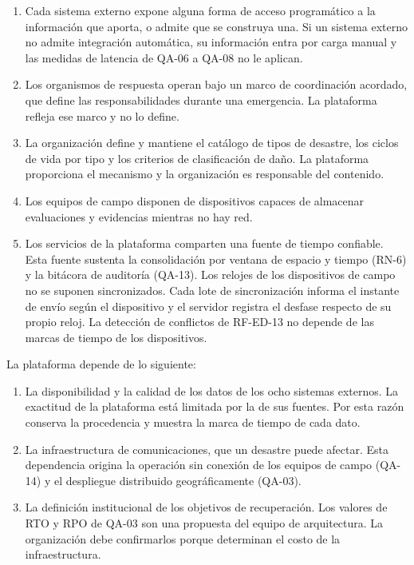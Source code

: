 \documentclass[11pt,letterpaper]{article}
\begin{document}
\begin{enumerate}[label=S-\arabic*.,leftmargin=1.4cm]
  \item Cada sistema externo expone alguna forma de acceso programático a la información que
        aporta, o admite que se construya una. Si un sistema externo no admite integración
        automática, su información entra por carga manual y las medidas de latencia de QA-06 a
        QA-08 no le aplican.
  \item Los organismos de respuesta operan bajo un marco de coordinación acordado, que define las
        responsabilidades durante una emergencia. La plataforma refleja ese marco y no lo define.
  \item La organización define y mantiene el catálogo de tipos de desastre, los ciclos de vida por
        tipo y los criterios de clasificación de daño. La plataforma proporciona el mecanismo y la
        organización es responsable del contenido.
  \item Los equipos de campo disponen de dispositivos capaces de almacenar evaluaciones y evidencias
        mientras no hay red.
  \item Los servicios de la plataforma comparten una fuente de tiempo confiable. Esta fuente
        sustenta la consolidación por ventana de espacio y tiempo (RN-6) y la bitácora de
        auditoría (QA-13). Los relojes de los dispositivos de campo no se suponen sincronizados.
        Cada lote de sincronización informa el instante de envío según el dispositivo y el servidor
        registra el desfase respecto de su propio reloj. La detección de conflictos de RF-ED-13 no
        depende de las marcas de tiempo de los dispositivos.
\end{enumerate}

La plataforma depende de lo siguiente:

\begin{enumerate}[label=D-\arabic*.,leftmargin=1.4cm]
  \item La disponibilidad y la calidad de los datos de los ocho sistemas externos. La exactitud de
        la plataforma está limitada por la de sus fuentes. Por esta razón conserva la procedencia y
        muestra la marca de tiempo de cada dato.
  \item La infraestructura de comunicaciones, que un desastre puede afectar. Esta dependencia
        origina la operación sin conexión de los equipos de campo (QA-14) y el despliegue
        distribuido geográficamente (QA-03).
  \item La definición institucional de los objetivos de recuperación. Los valores de RTO y RPO de
        QA-03 son una propuesta del equipo de arquitectura. La organización debe confirmarlos
        porque determinan el costo de la infraestructura.
\end{enumerate}
\end{document}

